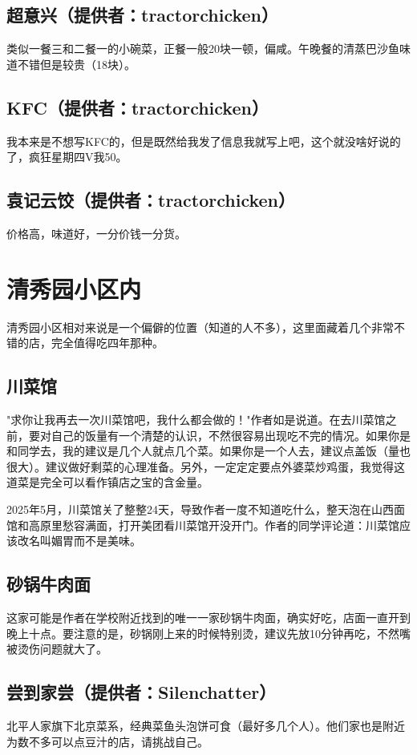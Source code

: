 \documentclass[lang=cn,color=blue,12pt,scheme=chinese,chinesefont=nofont]{elegantbook}
\begin{document}
\subsection{超意兴（提供者：tractorchicken）}
类似一餐三和二餐一的小碗菜，正餐一般20块一顿，偏咸。午晚餐的清蒸巴沙鱼味道不错但是较贵（18块）。

\subsection{KFC（提供者：tractorchicken）}
我本来是不想写KFC的，但是既然给我发了信息我就写上吧，这个就没啥好说的了，疯狂星期四V我50。

\subsection{袁记云饺（提供者：tractorchicken）}
价格高，味道好，一分价钱一分货。



\section{清秀园小区内}
\setlength{\parindent}{2em}
清秀园小区相对来说是一个偏僻的位置（知道的人不多），这里面藏着几个非常不错的店，完全值得吃四年那种。

\subsection{川菜馆}
"求你让我再去一次川菜馆吧，我什么都会做的！"作者如是说道。在去川菜馆之前，要对自己的饭量有一个清楚的认识，不然很容易出现吃不完的情况。如果你是和同学去，我的建议是几个人就点几个菜。如果你是一个人去，建议点盖饭（量也很大）。建议做好剩菜的心理准备。另外，一定定定要点外婆菜炒鸡蛋，我觉得这道菜是完全可以看作镇店之宝的含金量。

2025年5月，川菜馆关了整整24天，导致作者一度不知道吃什么，整天泡在山西面馆和高原里愁容满面，打开美团看川菜馆开没开门。作者的同学评论道：川菜馆应该改名叫媚胃而不是美味。

\subsection{砂锅牛肉面}
这家可能是作者在学校附近找到的唯一一家砂锅牛肉面，确实好吃，店面一直开到晚上十点。要注意的是，砂锅刚上来的时候特别烫，建议先放10分钟再吃，不然嘴被烫伤问题就大了。

\subsection{尝到家尝（提供者：Silenchatter）}
北平人家旗下北京菜系，经典菜鱼头泡饼可食（最好多几个人）。他们家也是附近为数不多可以点豆汁的店，请挑战自己。
\end{document}
